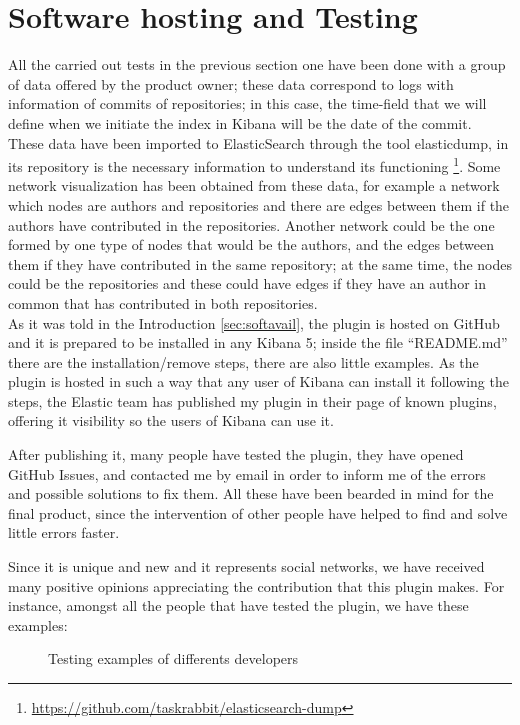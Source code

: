 \documentclass[a4paper, 12pt]{book}
\begin{document}
\section{Software hosting and Testing}
\label{sec:softhostest}

All the carried out tests in the previous section one have been done with a group of data offered by the product owner; these data correspond to logs with information of commits of repositories; in this case, the time-field that we will define when we initiate the index in Kibana will be the date of the commit.
These data have been imported to ElasticSearch through the tool elasticdump, in its repository is the necessary information to understand its functioning \footnote{\url{https://github.com/taskrabbit/elasticsearch-dump}}.
Some network visualization has been obtained from these data, for example a network which nodes are authors and repositories and there are edges between them if the authors have contributed in the repositories. Another network could be the one formed by one type of nodes that would be the authors, and the edges between them if they have contributed in the same repository; at the same time, the nodes could be the repositories and these could have edges if they have an author in common that has contributed in both repositories.\\

As it was told in the Introduction \ref{sec:softavail}, the plugin is hosted on GitHub and it is prepared to be installed in any Kibana 5; inside the file “README.md” there are the installation/remove steps, there are also little examples. As the plugin is hosted in such a way that any user of Kibana can install it following the steps, the Elastic team has published my plugin in their page of known plugins, offering it visibility so the users of Kibana can use it.

After publishing it, many people have tested the plugin, they have opened GitHub Issues, and contacted me by email in order to inform me of the errors and possible solutions to fix them. All these have been bearded in mind for the final product, since the intervention of other people have helped to find and solve little errors faster.

Since it is unique and new and it represents social networks, we have received many positive opinions appreciating the contribution that this plugin makes. For instance, amongst all the people that have tested the plugin, we have these examples:

\begin{figure}[H]
 \centering
 \caption{Testing examples of differents developers}
 \label{f:testdevelopers}
\end{figure}
\end{document}
